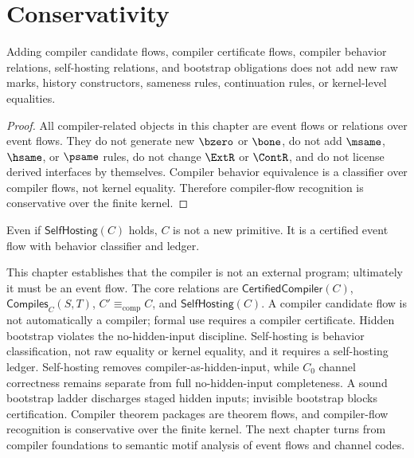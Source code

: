 \section{Conservativity}
\label{sec:self-hosting-compiler-conservativity}

\begin{theorem}
\label{thm:self-hosting-compiler-conservativity}
Adding compiler candidate flows, compiler certificate flows, compiler behavior relations, self-hosting relations, and bootstrap obligations does not add new raw marks, history constructors, sameness rules, continuation rules, or kernel-level equalities.
\end{theorem}

\begin{proof}
All compiler-related objects in this chapter are event flows or relations over event flows. They do not generate new $\bzero$ or $\bone$, do not add $\msame$, $\hsame$, or $\psame$ rules, do not change $\ExtR$ or $\ContR$, and do not license derived interfaces by themselves. Compiler behavior equivalence is a classifier over compiler flows, not kernel equality. Therefore compiler-flow recognition is conservative over the finite kernel.
\end{proof}

\begin{corollary}
\label{cor:self-hosting-compiler-not-primitive}
Even if $\mathsf{SelfHosting}(C)$ holds, $C$ is not a new primitive. It is a certified event flow with behavior classifier and ledger.
\end{corollary}

\begin{remark}[Outlook]
\label{rem:self-hosting-compiler-outlook}
This chapter establishes that the compiler is not an external program; ultimately it must be an event flow. The core relations are $\mathsf{CertifiedCompiler}(C)$, $\mathsf{Compiles}_C(S,T)$, $C'\equiv_{\mathrm{comp}}C$, and $\mathsf{SelfHosting}(C)$. A compiler candidate flow is not automatically a compiler; formal use requires a compiler certificate. Hidden bootstrap violates the no-hidden-input discipline. Self-hosting is behavior classification, not raw equality or kernel equality, and it requires a self-hosting ledger. Self-hosting removes compiler-as-hidden-input, while $C_0$ channel correctness remains separate from full no-hidden-input completeness. A sound bootstrap ladder discharges staged hidden inputs; invisible bootstrap blocks certification. Compiler theorem packages are theorem flows, and compiler-flow recognition is conservative over the finite kernel. The next chapter turns from compiler foundations to semantic motif analysis of event flows and channel codes.
\end{remark}
